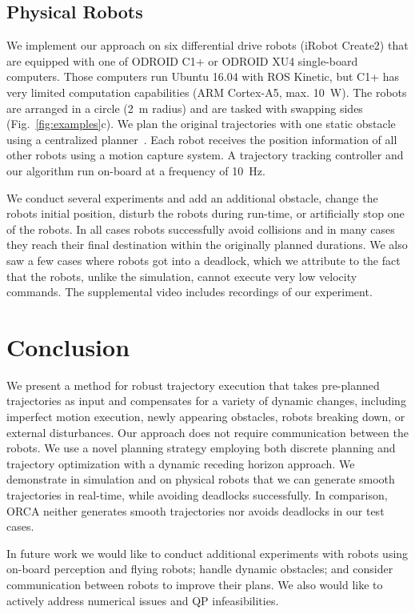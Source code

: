 \documentclass{svproc}
\begin{document}
\subsection{Physical Robots}
We implement our approach on six differential drive robots (iRobot Create2) that are equipped with one of ODROID C1+ or ODROID XU4 single-board computers.
Those computers run Ubuntu 16.04 with ROS Kinetic, but C1+ has very limited computation capabilities (ARM Cortex-A5, max. \SI{10}{W}).
The robots are arranged in a circle (\SI{2}{m} radius) and are tasked with swapping sides (Fig.~\ref{fig:examples}c).
We plan the original trajectories with one static obstacle using a centralized planner~\cite{crazyplanning-heterogeneous}.
Each robot receives the position information of all other robots using a motion capture system.
A trajectory tracking controller and our algorithm run on-board at a frequency of \SI{10}{Hz}.

We conduct several experiments and add an additional obstacle, change the robots initial position, disturb the robots during run-time, or artificially stop one of the robots.
In all cases robots successfully avoid collisions and in many cases they reach their final destination within the originally planned durations.
We also saw a few cases where robots got into a deadlock, which we attribute to the fact that the robots, unlike the simulation, cannot execute very low velocity commands.
The supplemental video includes recordings of our experiment.


\section{Conclusion}
We present a method for robust trajectory execution that takes pre-planned trajectories as input and compensates for a variety of dynamic changes, including imperfect motion execution, newly appearing obstacles, robots breaking down, or external disturbances.
Our approach does not require communication between the robots.
We use a novel planning strategy employing both discrete planning and trajectory optimization with a dynamic receding horizon approach.
We demonstrate in simulation and on physical robots that we can generate smooth trajectories in real-time, while avoiding deadlocks successfully. In comparison, ORCA neither generates smooth trajectories nor avoids deadlocks in our test cases.

In future work we would like to conduct additional experiments with robots using on-board perception and flying robots; handle dynamic obstacles; and consider communication between robots to improve their plans. We also would like to actively address numerical issues and QP infeasibilities.

\vfill

\pagebreak

%
%


\end{document}
